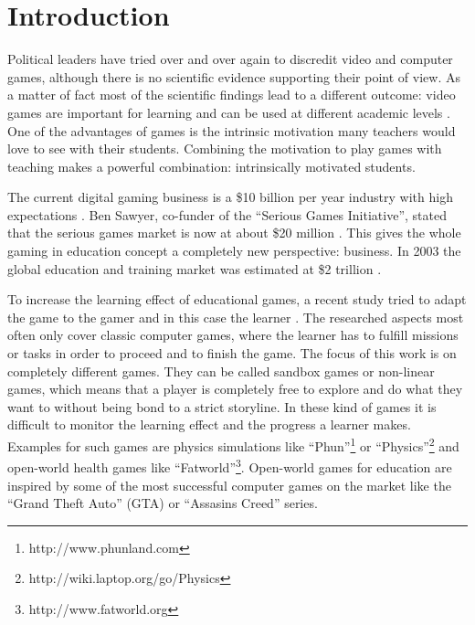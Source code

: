 \chapter{Introduction}


Political leaders have tried over and over again to discredit video and
computer games, although there is no scientific evidence supporting their
point of view. As a matter of fact most of the scientific findings lead
to a different outcome: video games are important for learning and can
be used at different academic levels \cite{DeAguilera2003}.
One of the advantages of games is the intrinsic motivation many teachers
would love to see with their students. Combining the motivation to
play games with teaching makes a powerful combination: intrinsically motivated
students.

The current digital gaming business is a \${10} billion per year industry
\cite{VanEck2006} with high expectations \cite{Susi2007}. Ben Sawyer, co-funder
of the ``Serious Games Initiative'', stated that the serious games market is
now at about \${20} million \cite{Susi2007}. This gives the whole gaming
in education concept a completely new perspective: business. In 2003 the global
education and training market was estimated at \${2} trillion \cite{Susi2007}.

To increase the learning effect of educational games, a recent study
tried to adapt the game to the gamer and in this case the learner
\cite{Kickmeier-Rust2006}. The researched aspects most often only cover
classic computer games, where the learner has to fulfill missions or
tasks in order to proceed and to finish the game. The focus of this work is on completely
different games. They can be called sandbox games or non-linear games,
which means that a player is completely free to explore and do what
they want to without being bond to a strict storyline. In these
kind of games it is difficult to monitor the learning effect and the
progress a learner makes. Examples for such games are physics simulations
like ``Phun''\footnote{http://www.phunland.com} or
``Physics''\footnote{http://wiki.laptop.org/go/Physics} and open-world health
games like ``Fatworld''\footnote{http://www.fatworld.org}. Open-world games for education are
inspired by some of the most successful computer games on the market like
the ``Grand Theft Auto'' (GTA) or ``Assasins Creed'' series.


